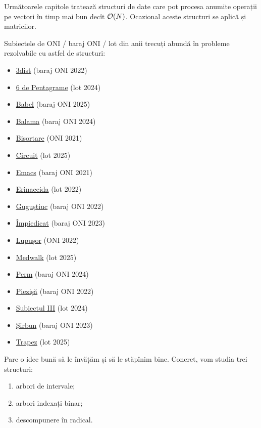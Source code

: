 \documentclass[../main.tex]{subfiles}
\begin{document}
Următoarele capitole tratează structuri de date care pot procesa anumite operații pe vectori în timp mai bun decît $\mathcal{O}(N)$. Ocazional aceste structuri se aplică și matricilor.

Subiectele de ONI / baraj ONI / lot din anii trecuți abundă în probleme rezolvabile cu astfel de structuri:

\begin{itemize}
  \item \href{https://kilonova.ro/problems/141}{3dist} (baraj ONI 2022)
  \item \href{https://kilonova.ro/problems/2801}{6 de Pentagrame} (lot 2024)
  \item \href{https://kilonova.ro/problems/3734}{Babel} (baraj ONI 2025)
  \item \href{https://kilonova.ro/problems/2666}{Balama} (baraj ONI 2024)
  \item \href{https://kilonova.ro/problems/63}{Bisortare} (ONI 2021)
  \item \href{https://kilonova.ro/problems/3806}{Circuit} (lot 2025)
  \item \href{https://kilonova.ro/problems/76}{Emacs} (baraj ONI 2021)
  \item \href{https://kilonova.ro/problems/210}{Erinaceida} (lot 2022)
  \item \href{https://kilonova.ro/problems/210}{Guguștiuc} (baraj ONI 2022)
  \item \href{https://kilonova.ro/problems/565}{Împiedicat} (baraj ONI 2023)
  \item \href{https://kilonova.ro/problems/137}{Lupușor} (ONI 2022)
  \item \href{https://kilonova.ro/problems/3790}{Medwalk} (lot 2025)
  \item \href{https://kilonova.ro/problems/2669}{Perm} (baraj ONI 2024)
  \item \href{https://kilonova.ro/problems/142}{Piezișă} (baraj ONI 2022)
  \item \href{https://kilonova.ro/problems/2843}{Subiectul III} (lot 2024)
  \item \href{https://kilonova.ro/problems/556}{Șirbun} (baraj ONI 2023)
  \item \href{https://kilonova.ro/problems/3790}{Trapez} (lot 2025)
\end{itemize}

Pare o idee bună să le învățăm și să le stăpînim bine.  Concret, vom studia trei structuri:

\begin{enumerate}
  \item arbori de intervale;
  \item arbori indexați binar;
  \item descompunere în radical.
\end{enumerate}
\end{document}
